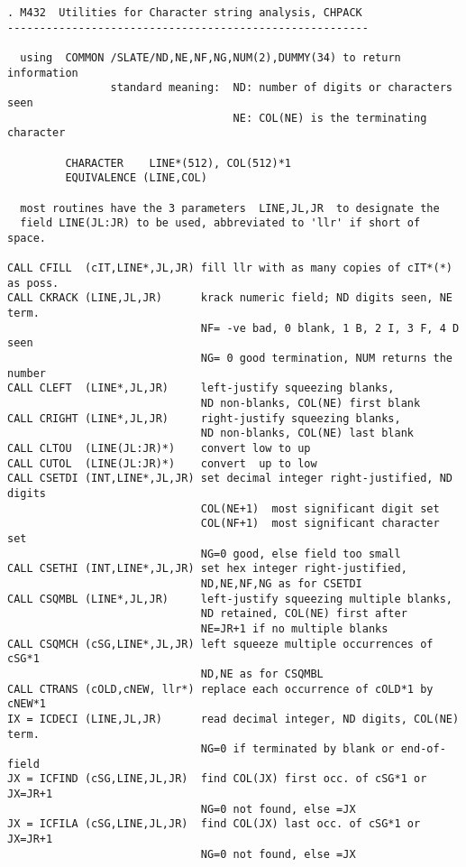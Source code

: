 \begin{verbatim}
. M432  Utilities for Character string analysis, CHPACK
--------------------------------------------------------

  using  COMMON /SLATE/ND,NE,NF,NG,NUM(2),DUMMY(34) to return information
                standard meaning:  ND: number of digits or characters seen
                                   NE: COL(NE) is the terminating character

         CHARACTER    LINE*(512), COL(512)*1
         EQUIVALENCE (LINE,COL)

  most routines have the 3 parameters  LINE,JL,JR  to designate the
  field LINE(JL:JR) to be used, abbreviated to 'llr' if short of space.

CALL CFILL  (cIT,LINE*,JL,JR) fill llr with as many copies of cIT*(*) as poss.
CALL CKRACK (LINE,JL,JR)      krack numeric field; ND digits seen, NE term.
                              NF= -ve bad, 0 blank, 1 B, 2 I, 3 F, 4 D seen
                              NG= 0 good termination, NUM returns the number
CALL CLEFT  (LINE*,JL,JR)     left-justify squeezing blanks,
                              ND non-blanks, COL(NE) first blank
CALL CRIGHT (LINE*,JL,JR)     right-justify squeezing blanks,
                              ND non-blanks, COL(NE) last blank
CALL CLTOU  (LINE(JL:JR)*)    convert low to up
CALL CUTOL  (LINE(JL:JR)*)    convert  up to low
CALL CSETDI (INT,LINE*,JL,JR) set decimal integer right-justified, ND digits
                              COL(NE+1)  most significant digit set
                              COL(NF+1)  most significant character set
                              NG=0 good, else field too small
CALL CSETHI (INT,LINE*,JL,JR) set hex integer right-justified,
                              ND,NE,NF,NG as for CSETDI
CALL CSQMBL (LINE*,JL,JR)     left-justify squeezing multiple blanks,
                              ND retained, COL(NE) first after
                              NE=JR+1 if no multiple blanks
CALL CSQMCH (cSG,LINE*,JL,JR) left squeeze multiple occurrences of cSG*1
                              ND,NE as for CSQMBL
CALL CTRANS (cOLD,cNEW, llr*) replace each occurrence of cOLD*1 by cNEW*1
IX = ICDECI (LINE,JL,JR)      read decimal integer, ND digits, COL(NE) term.
                              NG=0 if terminated by blank or end-of-field
JX = ICFIND (cSG,LINE,JL,JR)  find COL(JX) first occ. of cSG*1 or JX=JR+1
                              NG=0 not found, else =JX
JX = ICFILA (cSG,LINE,JL,JR)  find COL(JX) last occ. of cSG*1 or JX=JR+1
                              NG=0 not found, else =JX

\end{verbatim}
